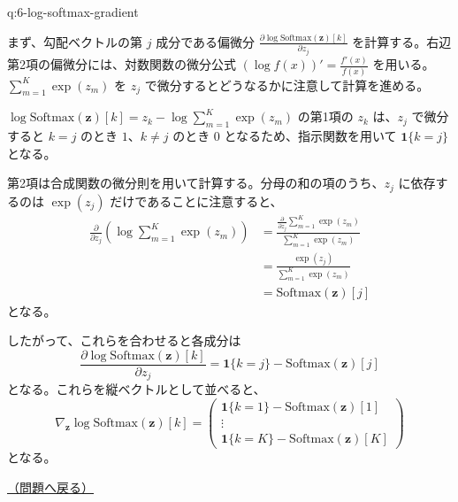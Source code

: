 \documentclass[
  pandoc]{bxjsarticle}
\begin{document}
\begin{answerbox}[phantomlabel=a:6-log-softmax-gradient]{q:6-log-softmax-gradient}

まず、勾配ベクトルの第 \(j\) 成分である偏微分
\(\frac{\partial \log \text{Softmax}(\mathbf{z})[k]}{\partial z_j}\)
を計算する。右辺第2項の偏微分には、対数関数の微分公式
\((\log f(x))' = \frac{f'(x)}{f(x)}\)
を用いる。\(\sum_{m=1}^K \exp(z_m)\) を \(z_j\)
で微分するとどうなるかに注意して計算を進める。

\(\log \text{Softmax}(\mathbf{z})[k] = z_k - \log \sum_{m=1}^K \exp(z_m)\)
の第1項の \(z_k\) は、\(z_j\) で微分すると \(k=j\) のとき
\(1\)、\(k \neq j\) のとき \(0\) となるため、指示関数を用いて
\(\mathbf{1}\{k=j\}\) となる。

第2項は合成関数の微分則を用いて計算する。分母の和の項のうち、\(z_j\)
に依存するのは \(\exp(z_j)\) だけであることに注意すると、 \begin{align*}
\frac{\partial}{\partial z_j} \left( \log \sum_{m=1}^K \exp(z_m) \right) &= \frac{\frac{\partial}{\partial z_j} \sum_{m=1}^K \exp(z_m)}{\sum_{m=1}^K \exp(z_m)} \\
&= \frac{\exp(z_j)}{\sum_{m=1}^K \exp(z_m)} \\
&= \text{Softmax}(\mathbf{z})[j]
\end{align*} となる。

したがって、これらを合わせると各成分は \[
\frac{\partial \log \text{Softmax}(\mathbf{z})[k]}{\partial z_j} = \mathbf{1}\{k=j\} - \text{Softmax}(\mathbf{z})[j]
\] となる。これらを縦ベクトルとして並べると、 \[
\nabla_{\mathbf{z}} \log \text{Softmax}(\mathbf{z})[k] =
\begin{pmatrix}
\mathbf{1}\{k=1\} - \text{Softmax}(\mathbf{z})[1] \\
\vdots \\
\mathbf{1}\{k=K\} - \text{Softmax}(\mathbf{z})[K]
\end{pmatrix}
\] となる。

\hfill 

\hyperref[q:6-log-softmax-gradient]{（問題へ戻る）}

\end{answerbox}
\end{document}
